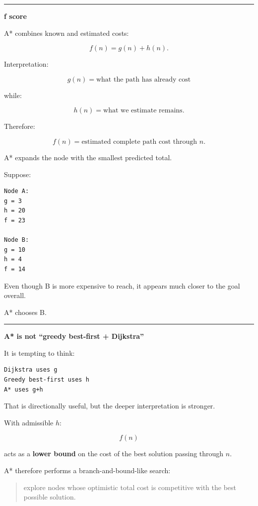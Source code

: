\begin{center}\rule{0.5\linewidth}{0.5pt}\end{center}

\textbf{f score}

A* combines known and estimated costs:

\[
\boxed{
f(n)=g(n)+h(n).
}
\]

Interpretation:

\[
g(n)
=
\text{what the path has already cost}
\]

while:

\[
h(n)
=
\text{what we estimate remains}.
\]

Therefore:

\[
f(n)
=
\text{estimated complete path cost through }n.
\]

A* expands the node with the smallest predicted total.

Suppose:

\begin{verbatim}
Node A:
g = 3
h = 20
f = 23

Node B:
g = 10
h = 4
f = 14
\end{verbatim}

Even though B is more expensive to reach, it appears much closer to the goal overall.

A* chooses B.

\begin{center}\rule{0.5\linewidth}{0.5pt}\end{center}

\textbf{A* is not ``greedy best-first + Dijkstra''}

It is tempting to think:

\begin{verbatim}
Dijkstra uses g
Greedy best-first uses h
A* uses g+h
\end{verbatim}

That is directionally useful, but the deeper interpretation is stronger.

With admissible \(h\):

\[
f(n)
\]

acts as a \textbf{lower bound} on the cost of the best solution passing through \(n\).

A* therefore performs a branch-and-bound-like search:

\begin{quote}
explore nodes whose optimistic total cost is competitive with the best possible solution.
\end{quote}

